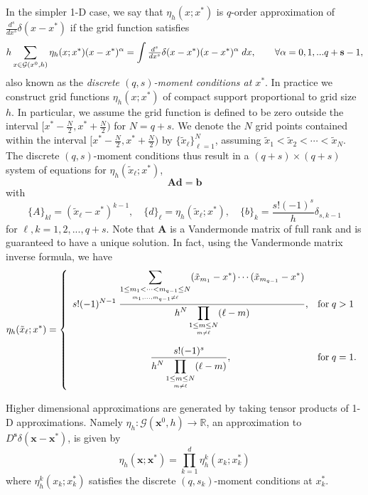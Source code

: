 In the simpler 1-D case, 
we say that $\eta_h(x;x^*)$ is $q$-order approximation of $\tfrac{d^s}{dx^s}\delta(x-x^*)$ if the grid function satisfies \begin{equation}
\label{eq:momcond}
       h \sum_{x\in\mathcal G(x^0,h)} \eta_h(x;x^*) (x-x^*)^{\alpha} = 
       \int \tfrac{d^s}{dx^s}\delta(x-x^*)(x-x^*)^{\alpha} \; dx,
       \quad\quad \forall \alpha =0,1,... q+{\bf s}-1,
\end{equation}
also known as the {\em discrete $(q,s)$-moment conditions at $x^*$}.
In practice we construct grid functions $\eta_{h}(x;x^*)$ of compact support proportional to grid size $h$.
In particular, we assume the grid function is defined to be zero outside the interval $[x^*-\tfrac{N}{2},x^*+\tfrac{N}{2})$ for $N=q+s$.
We denote the $N$ grid points contained within the interval $[x^*-\tfrac{N}{2},x^*+\tfrac{N}{2})$ by $\{\tilde x_\ell\}_{\ell=1}^N$, assuming $\tilde x_1 < \tilde x_2< \cdots < \tilde x_N$.
The discrete $(q,s)$-moment conditions thus result in a $(q+s)\times(q+s)$ system of equations for $\eta_h(\tilde x_\ell;x^*)$,
\[
	\mathbf A \mathbf d = \mathbf b
\]
with
\[
	\{A\}_{kl} = (\tilde x_\ell - x^*)^{k-1}, \quad
	\{d\}_\ell = \eta_{h}(\tilde x_\ell;x^*), \quad
	\{b\}_k = \frac{s!(-1)^{s}}{h} \delta_{s,k-1}
\]
for $\ell,k=1,2,...,q+s$.
Note that $\mathbf A$ is a Vandermonde matrix of full rank and is guaranteed to have a unique solution.
In fact, using the Vandermonde matrix inverse formula, we have
\begin{equation}\label{eq:eta}
	 \eta_h(\tilde x_\ell;x^*) = \left\{ \begin{array}{cl}
		\displaystyle
		s! (-1)^{N-1} \; 
		\frac{
			\displaystyle
			\sum_{\underset{m_1,...,m_{q-1}\neq \ell}{1\le m_1<\cdots<m_{q-1}\le N}}
			 ( \tilde x_{m_1} - x^*) \cdots ( \tilde x_{m_{q-1}} -x^*)
		}
		{
			\displaystyle
			h^{N}\prod_{\underset{m\neq \ell}{1\le m\le N}} ( \ell - m)
		}
		,& \text{for} \; q>1  \vspace{10pt} \\ 
		\displaystyle
		\frac{
			s! (-1)^{s}
		}
		{
			\displaystyle
			h^{N} \prod_{\underset{m\neq \ell}{1\le m\le N}} (\ell - m)
		}
		,& \text{for}\; q=1.
	\end{array}\right.
\end{equation}

Higher dimensional approximations are generated by taking tensor products of 1-D approximations. 
Namely $\eta_{h}:\mathcal G(\mathbf x^0,h) \to \mathbb R$, an approximation to $D^{\mathbf s}\delta(\mathbf x-\mathbf x^*)$, is given by
\[
	\eta_h(\mathbf x;\mathbf x^*) = \prod_{k=1}^d \eta^k_h(x_k;x^*_k)
\]
where $\eta^k_h(x_k;x^*_k)$ satisfies the discrete $(q,s_k)$-moment conditions at $x^*_k$.


